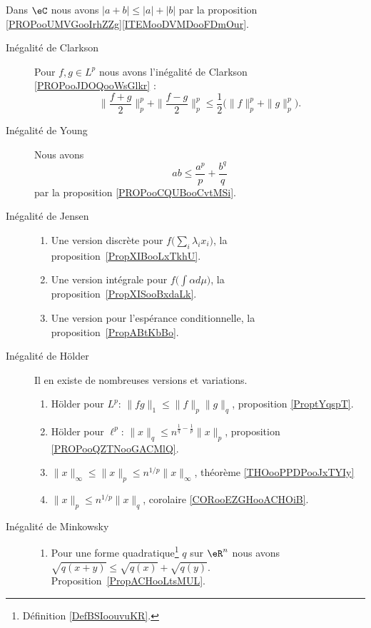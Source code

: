 Dans \( \eC\) nous avons \( | a+ b|\leq | a |+| b |\) par la proposition \ref{PROPooUMVGooIrhZZg}\ref{ITEMooDVMDooFDmOur}.
\begin{description}
	\item[Inégalité de Clarkson]
		Pour \( f,g\in L^p\) nous avons l'inégalité de Clarkson \ref{PROPooJDOQooWsGlkr} :
		\begin{equation}
			\| \frac{ f+g }{2} \|_p^p+\| \frac{ f-g }{2} \|_p^p\leq \frac{ 1 }{2}\Big( \| f \|_p^p+\| g \|_p^p \Big).
		\end{equation}
	\item[Inégalité de Young]
		Nous avons
		\begin{equation}
			ab\leq \frac{ a^p }{ p }+\frac{ b^q }{ q }
		\end{equation}
		par la proposition \ref{PROPooCQUBooCvtMSi}.
	\item[Inégalité de Jensen]
		\begin{enumerate}
			\item
			      Une version discrète pour \( f\big( \sum_i\lambda_ix_i \big)\), la proposition~\ref{PropXIBooLxTkhU}.
			\item
			      Une version intégrale pour \( f\big( \int \alpha d\mu \big)\), la proposition~\ref{PropXISooBxdaLk}.
			\item
			      Une version pour l'espérance conditionnelle, la proposition~\ref{PropABtKbBo}.
		\end{enumerate}
	\item[Inégalité de Hölder]
		Il en existe de nombreuses versions et variations.
		\begin{enumerate}
			\item
			      Hölder pour \( L^p\): \( \| fg \|_1\leq \| f \|_p\| g \|_q\), proposition \ref{ProptYqspT}.
			\item
			      Hölder pour \( \ell^p\): \( \| x \|_q\leq n^{\frac{1}{ q }-\frac{1}{ p }}\| x \|_p\), proposition \ref{PROPooQZTNooGACMlQ}.
			\item
			      $\| x \|_{\infty}\leq \| x \|_p\leq n^{1/p}\| x \|_{\infty}$, théorème \ref{THOooPPDPooJxTYIy}
			\item
			      $\| x \|_p\leq n^{1/p} \| x \|_q$, corolaire \ref{CORooEZGHooACHOiB}.
		\end{enumerate}
	\item[Inégalité de Minkowsky]
		\begin{enumerate}
			\item
			      Pour une forme quadratique\footnote{Définition \ref{DefBSIoouvuKR}.} \( q\) sur \( \eR^n\) nous avons \( \sqrt{q(x+y)}\leq\sqrt{q(x)}+\sqrt{q(y)}\). Proposition~\ref{PropACHooLtsMUL}.

\end{enumerate}
\end{description}
